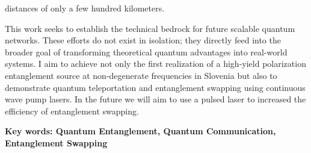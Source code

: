 \documentclass{article}
\begin{document}
distances of only a few hundred kilometers. \par This work seeks to establish
the technical bedrock for future scalable quantum networks. These efforts do
not exist in isolation; they directly feed into the broader goal of
transforming theoretical quantum advantages into real-world systems. I aim to
achieve not only the first realization of a high-yield polarization
entanglement source at non-degenerate frequencies in Slovenia but also to
demonstrate quantum teleportation and entanglement swapping using continuous
wave pump lasers. In the future we will aim to use a pulsed laser to increased
the efficiency of entanglement swapping.
\par\textbf{Key words: Quantum Entanglement, Quantum Communication,
	Entanglement Swapping}
\end{document}
